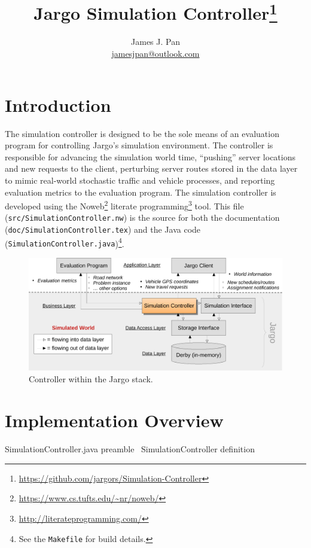 \documentclass{article}
\title{Jargo Simulation Controller\footnote{\url{https://github.com/jargors/Simulation-Controller}}}
\author{James J. Pan\\
  \small{\href{mailto:jamesjpan@outlook.com}{jamesjpan@outlook.com}}
}
\def\nwendcode{\endtrivlist \endgroup}
\let\nwdocspar=\par
\begin{document}
\maketitle
\pagestyle{noweb}

\tableofcontents

\section{Introduction}
\label{sec:introduction}
The simulation controller is designed to be the sole means of an evaluation
program for controlling Jargo's simulation environment. The controller is
responsible for advancing the simulation world time, ``pushing'' server
locations and new requests to the client, perturbing server routes stored in
the data layer to mimic real-world stochastic traffic and vehicle processes,
and reporting evaluation metrics to the evaluation program.  The simulation
controller is developed using the
Noweb\footnote{\url{https://www.cs.tufts.edu/~nr/noweb/}} literate
programming\footnote{\url{http://literateprogramming.com/}} tool.  This file
({\tt{}src/SimulationController.nw}) is the source for both the documentation
({\tt{}doc/SimulationController.tex}) and the Java code
({\tt{}SimulationController.java})\footnote{See the {\tt{}Makefile} for build
details.}.

\begin{figure}[h]
\centering
\includegraphics[width=150mm]{src/fig/controller-fig}
\caption{Controller within the Jargo stack.}
\label{fig:controller}
\end{figure}

\section{Implementation Overview}
\endmoddef{}
  \LA{}SimulationController.java preamble~{\nwtagstyle{}}\RA{}
  \LA{}\code{}SimulationController\edoc{} definition~{\nwtagstyle{}}\RA{}
\nwendcode{}\nwdocspar
\end{document}
